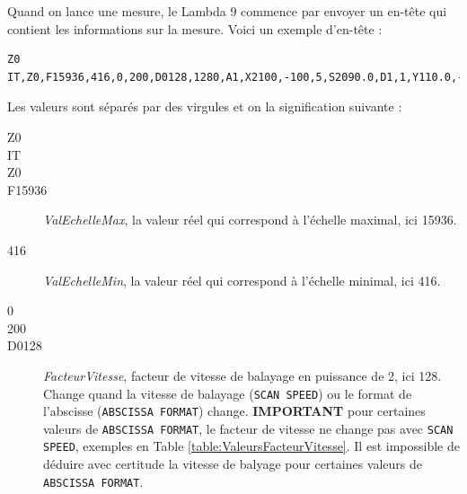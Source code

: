 \documentclass[a4paper, 12pt]{article}
\begin{document}
Quand on lance une mesure, le Lambda 9 commence par envoyer un en-tête qui contient les informations sur la mesure. Voici un exemple d'en-tête :
\begin{lstlisting}
Z0
IT,Z0,F15936,416,0,200,D0128,1280,A1,X2100,-100,5,S2090.0,D1,1,Y110.0,-22.000,4,Z0,D0128,1280,L1
\end{lstlisting}
Les valeurs sont séparés par des virgules et on la signification suivante :
\begin{description}
	\item[Z0]
	\item[IT]
	\item[Z0]
	\item[F15936] \emph{ValEchelleMax}, la valeur réel qui correspond à l'échelle maximal, ici 15936.
	\item[416] \emph{ValEchelleMin}, la valeur réel qui correspond à l'échelle minimal, ici 416.
	\item[0]
	\item[200]
	\item[D0128] \emph{FacteurVitesse}, facteur de vitesse de balayage en puissance de 2, ici 128.
		Change quand la vitesse de balayage (\verb|SCAN SPEED|) ou le format de l'abscisse (\verb|ABSCISSA FORMAT|) change.
		\textbf{IMPORTANT} pour certaines valeurs de \verb|ABSCISSA FORMAT|, le facteur de vitesse ne change pas avec \verb|SCAN SPEED|, exemples en Table \ref{table:ValeursFacteurVitesse}.
		Il est impossible de déduire avec certitude la vitesse de balyage pour certaines valeurs de \verb|ABSCISSA FORMAT|.


\end{description}
\end{document}
